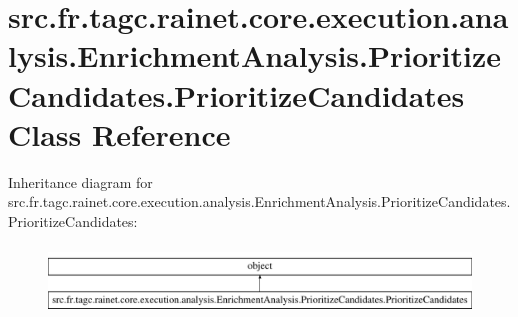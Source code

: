\hypertarget{classsrc_1_1fr_1_1tagc_1_1rainet_1_1core_1_1execution_1_1analysis_1_1EnrichmentAnalysis_1_1Prior94c714899de0f856e07a4365752425c2}{\section{src.\-fr.\-tagc.\-rainet.\-core.\-execution.\-analysis.\-Enrichment\-Analysis.\-Prioritize\-Candidates.\-Prioritize\-Candidates Class Reference}
\label{classsrc_1_1fr_1_1tagc_1_1rainet_1_1core_1_1execution_1_1analysis_1_1EnrichmentAnalysis_1_1Prior94c714899de0f856e07a4365752425c2}
}
Inheritance diagram for src.\-fr.\-tagc.\-rainet.\-core.\-execution.\-analysis.\-Enrichment\-Analysis.\-Prioritize\-Candidates.\-Prioritize\-Candidates\-:\begin{figure}[H]
\begin{center}
\leavevmode
\includegraphics[height=1.860465cm]{classsrc_1_1fr_1_1tagc_1_1rainet_1_1core_1_1execution_1_1analysis_1_1EnrichmentAnalysis_1_1Prior94c714899de0f856e07a4365752425c2}
\end{center}
\end{figure}
